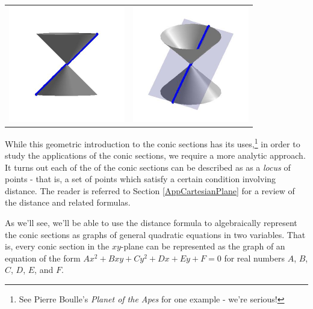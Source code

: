 \documentclass{ximera}
\begin{document}
\begin{center}
\begin{tabular}{cc}
\includegraphics[width=2in]{./IntrotoConicsGraphics/Tline01.jpg} & \includegraphics[width=2in]{./IntrotoConicsGraphics/Tline02.jpg} \\

\end{tabular}

\end{center}

\enlargethispage{.5in}
While this geometric introduction to the conic sections has its uses,\footnote{See Pierre Boulle's \textit{Planet of the Apes} for one example - we're serious!} in order to study the applications of the conic sections, we require a more analytic approach.  It turns out each of the  of the conic sections can be described as as a \textit{locus} of points - that is, a set of points which satisfy a certain condition involving distance.  The reader is referred to Section \ref{AppCartesianPlane} for a review of the distance and related formulas.

As we'll see, we'll be able to use the distance formula to algebraically represent the conic sections as  graphs of general quadratic equations in two variables.  That is, every conic section in the $xy$-plane can be represented as the graph of an equation of the form $Ax^2+Bxy+Cy^2+Dx+Ey +F = 0$ for real numbers $A$, $B$, $C$, $D$, $E$, and $F$.

\closegraphsfile
\end{document}
